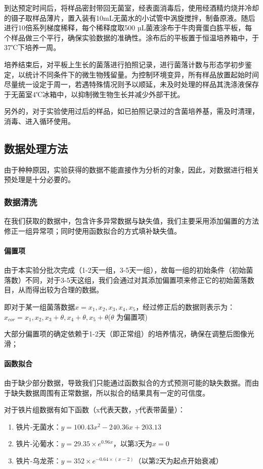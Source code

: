 \documentclass[12pt,a4paper]{ctexart}
\begin{document}
到达预定时间后，将样品密封带回无菌室，经表面消毒后，使用经酒精灼烧并冷却的镊子取样品薄片，置入装有10mL无菌水的小试管中涡旋搅拌，制备原液。随后进行10倍系列梯度稀释，每个稀释度取500 µL菌液涂布于牛肉膏蛋白胨平板，每个样品做三个平行，确保实验数据的准确性。涂布后的平板置于恒温培养箱中，于37℃下培养一周。

培养结束后，对平板上生长的菌落进行拍照记录，进行菌落计数与形态学初步鉴定，以统计不同条件下的微生物残留量。为控制环境变异，所有样品放置起始时间尽量统一设定于周一，若遇特殊情况则予以顺延，未及时处理的样品其洗涤液保存于无菌室4℃冰箱中，以抑制微生物生长并减少外部干扰。

另外的，对于实验使用过后的样品，如已拍照记录过的含菌培养基，需及时清理，消毒、进入循环使用。

\subsection{数据处理方法}
由于种种原因，实验获得的数据不能直接作为分析的对象，因此，对数据进行相关预处理是十分必要的。
\subsubsection{数据清洗}
在我们获取的数据中，包含许多异常数据与缺失值，我们主要采用添加偏置的方法修正一组异常项；同时使用函数拟合的方式填补缺失值。
\paragraph{偏置项}
由于本实验分批次完成（1-2天一组，3-5天一组），故每一组的初始条件（初始菌落数）不同，对于3-5天这组，我们会通过对其添加偏置项来修正它的初始菌落数目，从而得出较为合理的数据。


即对于某一组菌落数据${x}={x_1,x_2,x_3,x_4,x_5}$，经过修正后的数据则表示为：$x_{cor}=x_1,x_2,x_3+\theta,x_4+\theta,x_5+\theta $($\theta$ 为偏置项)

大部分偏置项的确定依赖于1-2天（即正常组）的培养情况，确保在调整后图像光滑；

\paragraph{函数拟合}
由于缺少部分数据，导致我们只能通过函数拟合的方式预测可能的缺失数据。而由于缺失数据周围有正常数据，所以拟合的结果具有一定的可信度。

对于铁片组数据有如下函数（x代表天数，y代表带菌量）：
\begin{enumerate}
    \item 铁片-无菌水：$ y = 100.43x^2 - 240.36x + 203.13$
    \item 铁片-沁葡水：$y = 29.35 \times e^{0.96x}$，以第3天为$x=0$
    \item 铁片-乌龙茶：$y = 352 \times e^{-0.64 \times (x-2)} $（以第2天为起点开始衰减）
\end{enumerate}
\end{document}
